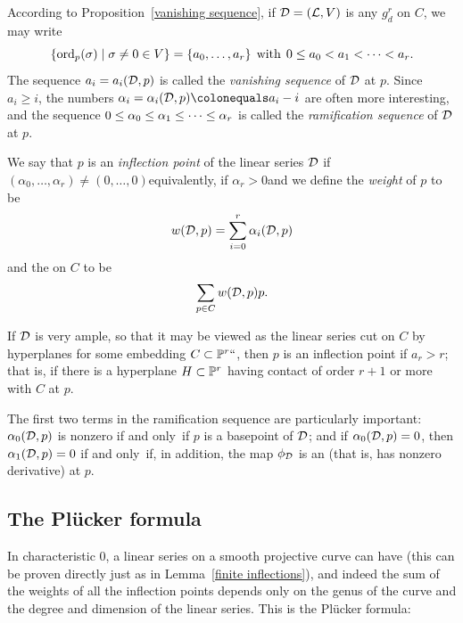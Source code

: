 According to  Proposition~\ref{vanishing sequence}, if ${\mathcal D} = ({\mathcal L}, V)$
is any $g^r_d$ on $C$, we may write
$$
\{ \ord_p(\sigma) \mid \sigma \neq 0 \in V \} = \{a_0,\dots,a_r\} \;
\text{ with } \; 0\leq a_0 < a_1 < \dots < a_r.
$$
The sequence $a_i = a_i({\mathcal D},p)$ is called the
%
\emph{vanishing sequence} of ${\mathcal D}$ at $p$.  Since $a_i \geq i$,
the numbers
$\alpha_i = \alpha_i(\cD,p) \colonequals  a_i - i$ are often more
interesting,
and the sequence $0 \leq \alpha_0 \leq \alpha_1 \leq \dots \leq
\index{ramification sequence|defi}%
\alpha_r$ is called the \emph{ramification sequence} of ${\mathcal D}$ at $p$.

We say that $p$ is an \emph{inflection point} of the linear series ${\mathcal D}$
if $(\alpha_0,\dots,\alpha_r) \neq (0,\dots,0)$\emdash equivalently,
if $\alpha_r > 0$\emdash and we define the \emph{weight} of $p$ to be
%
$$
w({\mathcal D}, p) = \sum_{i=0}^r \alpha_i({\mathcal D}, p)
$$
and the 
%
%
 on $C$ to be 
$$
\sum_{p\in C}w({\mathcal D}, p)p.
$$

If ${\mathcal D}$ is very ample, so that it may be viewed as the linear series cut
on $C$ by hyperplanes for some embedding $C \subset {\mathbb P}^r` `$, then $p$
is an inflection point if $a_r > r$; that is, if there is a hyperplane
$H \subset {\mathbb P}^r$ having contact of order $r+1$ or more with $C$ at $p$.

The first two terms in the ramification sequence are particularly
important: $\alpha_0({\mathcal D}, p)$ is nonzero if and only~if $p$ is a basepoint
of ${\mathcal D}$; and if $\alpha_0({\mathcal D}, p)=0$, then $\alpha_1({\mathcal D}, p) = 0$ if
and only~if, in addition, the map $\phi_{\mathcal D}$ is an 
%
(that is,
has nonzero derivative) at $p$.

\subsection*{The Pl\"ucker formula}

In characteristic 0, a linear series on a smooth projective curve can
%
have  (this can be proven
directly just as in Lemma~\ref{finite inflections}), and indeed the
sum of the weights of all the inflection points depends only on the
genus of the curve and the degree and dimension 
of the linear
series. This is the Pl\"ucker formula:

